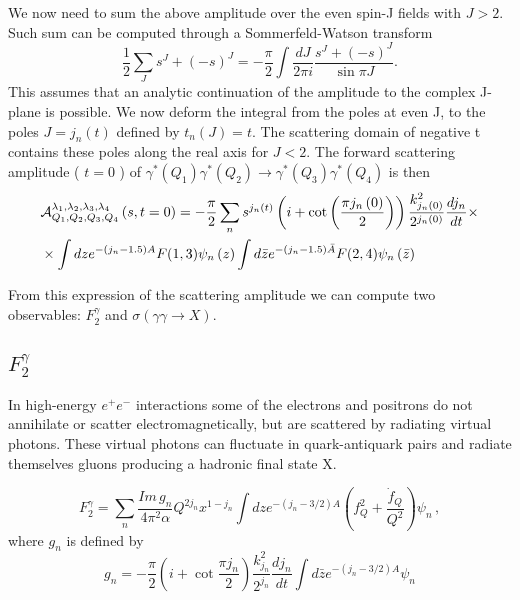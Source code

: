 \documentclass[preprint, 12pt]{elsarticle}
\begin{document}
We now need to sum the above amplitude over the even spin-J fields with $J>2$. Such sum can be computed through a Sommerfeld-Watson transform
\begin{equation}
\frac{1}{2} \sum_J s^J + (-s)^J = -\frac{\pi}{2} \int \frac{dJ}{2 \pi i} \frac{s^J + (-s)^J}{\sin \pi J}.
\end{equation}
This assumes that an analytic continuation of the amplitude to the complex J-plane is possible. We now deform the integral from the poles at even J, to the poles $J = j_n\left(t\right)$ defined by $t_n(J) = t$. The scattering domain of negative t contains these poles along the real axis for $J<2$. The forward scattering amplitude ( $t= 0$ ) of $\gamma^{*}\left(Q_1\right)\gamma^{*}\left(Q_2\right) \rightarrow \gamma^{*}\left(Q_3\right) \gamma^{*}\left(Q_4\right)$ is then
\begin{align}
&\mathcal{A}^{\lambda_1, \lambda_2, \lambda_3, \lambda_4}_{Q_1, Q_2, Q_3, Q_4}\left(s,t = 0\right) = - \frac{\pi}{2} \sum_n s^{j_n\left(t\right)} \left( i + \cot\left(\frac{\pi j_n\left(0\right)}{2}\right) \right) \frac{k_{j_n\left(0\right)}^2}{2^{j_n\left(0\right)}} \frac{d j_n}{dt} \times \notag \\
& \times \int dz e^{-(j_n - 1.5) A} F(1,3) \psi_n\left(z\right) \int d\bar{z} e^{-(j_n-1.5)\bar{A}} F(2,4) \psi_n\left(\bar{z}\right)
\label{eq:scattering_amplitude}
\end{align}

From this expression of the scattering amplitude we can compute two observables: $F_2^\gamma$ and $\sigma\left(\gamma \gamma \rightarrow X\right)$.
\subsection{$F_2^\gamma$}
In high-energy $e^{+}e^{-}$ interactions some of the electrons and positrons do not annihilate or scatter electromagnetically, but are scattered by radiating virtual photons. These virtual photons can fluctuate in quark-antiquark pairs and radiate themselves gluons producing a hadronic final state X.


\begin{equation}
F_2^\gamma = \sum_n \frac{ Im \, g_n}{4 \pi^2 \alpha} Q^{2 j_n} x^{1- j_n} \int dz e^{- \left( j_n - 3/2\right) A} \left( f_Q^2 + \frac{\dot{f}_Q}{Q^2} \right) \psi_n \, ,
\end{equation}
where $g_n$ is defined by
\begin{equation}
g_n = - \frac{\pi}{2} \left( i + \cot \frac{\pi j_n}{2} \right) \frac{k^2_{j_n}}{2^{j_n}} \frac{d j_n}{dt} \int d\bar{z} e^{-\left(j_n - 3/2 \right)A} \psi_n
\end{equation}
\end{document}
